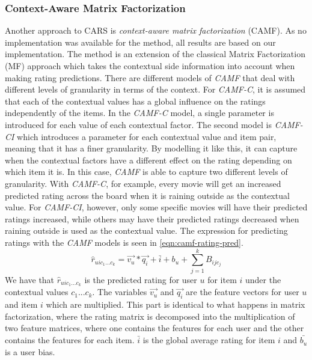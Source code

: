 \subsubsection{Context-Aware Matrix Factorization}\label{subsec:camf}
Another approach to CARS is \textit{context-aware matrix factorization} (CAMF)\cite{baltrunasCAMF}.
As no implementation was available for the method, all results are based on our implementation.
The method is an extension of the classical Matrix Factorization (MF) approach which takes the contextual side information into account when making rating predictions.
There are different models of \textit{CAMF} that deal with different levels of granularity in terms of the context.
For \textit{CAMF-C}, it is assumed that each of the contextual values has a global influence on the ratings independently of the items.
In the \textit{CAMF-C} model, a single parameter is introduced for each value of each contextual factor.
The second model is \textit{CAMF-CI} which introduces a parameter for each contextual value and item pair, meaning that it has a finer granularity.
By modelling it like this, it can capture when the contextual factors have a different effect on the rating depending on which item it is.
In this case, \textit{CAMF} is able to capture two different levels of granularity.
With \textit{CAMF-C}, for example, every movie will get an increased predicted rating across the board when it is raining outside as the contextual value.
For \textit{CAMF-CI}, however, only some specific movies will have their predicted ratings increased, while others may have their predicted ratings decreased when raining outside is used as the contextual value.
The expression for predicting ratings with the \textit{CAMF} models is seen in \autoref{eqn:camf-rating-pred}.
\begin{equation}
    \label{eqn:camf-rating-pred}
    \hat{r}_{uic_1...c_k} = \vec{v_u} * \vec{q_i} + \bar{i} + b_u + \sum\limits_{j = 1}^k B_{ijc_j}
\end{equation}
We have that $\hat{r}_{uic_1...c_k}$ is the predicted rating for user $u$ for item $i$ under the contextual values $c_1...c_k$.
The variables $\vec{v_u} $ and $ \vec{q_i}$ are the feature vectors for user $u$ and item $i$ which are multiplied.
This part is identical to what happens in matrix factorization, where the rating matrix is decomposed into the multiplication of two feature matrices, where one contains the features for each user and the other contains the features for each item.
$\bar{i}$ is the global average rating for item $i$ and $\bar{b_u}$ is a user bias. 
